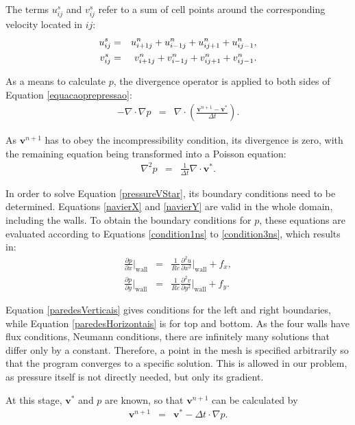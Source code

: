 \documentclass[journal]{IEEEtran}
\begin{document}
The terms $u^s_{ij}$ and $v^s_{ij}$ refer to a sum of cell points around the corresponding velocity located in $ij$: \begin{eqnarray}
u_{ij}^s &=& \SumFour{u} \label{us}, \\
v_{ij}^s &=& \SumFour{v} \label{vs}.
\end{eqnarray}

As a means to calculate $p$, the divergence operator is applied to both sides of Equation \ref{equacaoprepressao}: \begin{eqnarray}
	-\nabla\cdot\nabla p & = &\nabla\cdot \left(\frac{\textbf{v}^{n+1}-\textbf{v}^*}{\Delta t}\right).
\end{eqnarray}

As $\mathbf{v}^{n+1}$ has to obey the incompressibility condition, its divergence is zero, with the remaining equation being transformed into a Poisson equation: \begin{eqnarray}
\nabla^2 p & = & \frac{1}{\Delta t}\nabla\cdot \textbf{v}^{*}.	 \label{pressureVStar}
\end{eqnarray}



In order to solve Equation \ref{pressureVStar}, its boundary conditions need to be determined. Equations \ref{navierX} and \ref{navierY} are valid in the whole domain, including the walls. To obtain the boundary conditions for $p$, these equations are evaluated according to Equations \ref{condition1ns} to \ref{condition3ns}, which results in:\begin{eqnarray} \frac{\partial p}{\partial x}\Bigg|_{\textrm{wall}}&=&\frac{1}{\mathit{Re}}\frac{\partial^2
u}{\partial x^2}\Bigg|_{\textrm{wall}}+f_x,\label{paredesVerticais}\\
\frac{\partial p}{\partial y}\Bigg|_{\textrm{wall}}&=&\frac{1}{\mathit{Re}}\frac{\partial^2
v}{\partial y^2}\Bigg|_{\textrm{wall}}+f_y.\label{paredesHorizontais}
\end{eqnarray}

Equation \ref{paredesVerticais} gives conditions for the left and right boundaries, while Equation \ref{paredesHorizontais} is for top and bottom. As the four walls have flux conditions, Neumann conditions, there are infinitely many solutions that differ only by a constant. Therefore, a point in the mesh is specified arbitrarily so that the program converges to a specific solution. This is allowed in our problem, as pressure itself is not directly needed, but only its gradient.

At this stage, $\mathbf{v}^*$ and $p$ are known, so that $\mathbf{v}^{n+1}$ can be calculated by \begin{eqnarray}
	\mathbf{v}^{n+1} & = & \mathbf{v}^*  - \Delta t\cdot  \nabla p. \label{nextStepV}
\end{eqnarray}
\end{document}
